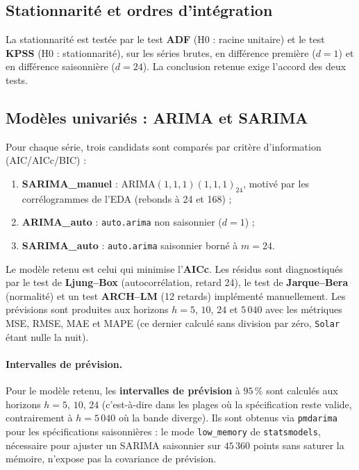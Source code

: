 \subsection{Stationnarité et ordres d'intégration}
La stationnarité est testée par le test \textbf{ADF} (H0 : racine unitaire) et
le test \textbf{KPSS} (H0 : stationnarité), sur les séries brutes, en
différence première (\(d=1\)) et en différence saisonnière (\(d=24\)). La
conclusion retenue exige l'accord des deux tests.

\subsection{Modèles univariés : ARIMA et SARIMA}
Pour chaque série, trois candidats sont comparés par critère d'information
(AIC/AICc/BIC) :
\begin{enumerate}
  \item \textbf{SARIMA\_manuel} : \(\text{ARIMA}(1,1,1)(1,1,1)_{24}\), motivé
        par les corrélogrammes de l'EDA (rebonds à 24 et 168) ;
  \item \textbf{ARIMA\_auto} : \texttt{auto.arima} non saisonnier (\(d=1\)) ;
  \item \textbf{SARIMA\_auto} : \texttt{auto.arima} saisonnier borné à
        \(m=24\).
\end{enumerate}
Le modèle retenu est celui qui minimise l'\textbf{AICc}. Les résidus sont
diagnostiqués par le test de \textbf{Ljung--Box} (autocorrélation, retard 24),
le test de \textbf{Jarque--Bera} (normalité) et un test \textbf{ARCH--LM}
(12 retards) implémenté manuellement. Les prévisions sont produites aux
horizons \(h=5\), \(10\), \(24\) et \(5\,040\) avec les métriques MSE, RMSE,
MAE et MAPE (ce dernier calculé sans division par zéro, \texttt{Solar} étant
nulle la nuit).

\paragraph{Intervalles de prévision.}
Pour le modèle retenu, les \textbf{intervalles de prévision} à \(95\,\%\)
sont calculés aux horizons \(h=5,\,10,\,24\) (c'est-à-dire dans les plages où
la spécification reste valide, contrairement à \(h=5\,040\) où la bande
diverge). Ils sont obtenus via \texttt{pmdarima} pour les spécifications
saisonnières : le mode \texttt{low\_memory} de \texttt{statsmodels},
nécessaire pour ajuster un SARIMA saisonnier sur \(45\,360\) points sans
saturer la mémoire, n'expose pas la covariance de prévision.

